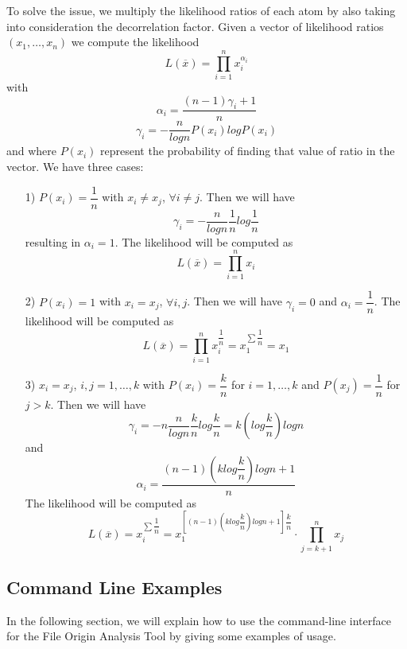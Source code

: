 To solve the issue, we multiply the likelihood ratios of each atom by also taking into consideration the decorrelation factor.
Given a vector of likelihood ratios $(x_{1},\ldots,x_{n})$ we compute the likelihood $$ L(\overline{x}) = \prod\limits_{i=1}^{n} x_{i}^{\alpha_{i}} $$ with $$ \alpha_{i} = \dfrac{(n-1)\gamma_{i}+1}{n} $$ $$ \gamma_{i} = - \dfrac{n}{log n} P(x_{i})log P(x_{i}) $$ and where $P(x_{i})$ represent the probability of finding that value of ratio in the vector.
We have three cases:

\begin{itemize}

\item[1)] $P(x_{i}) = \dfrac{1}{n} $ with $x_{i} \neq x_{j}$, $ \forall i \neq j $.
Then we will have $$ \gamma_{i} = - \dfrac{n}{log n} \dfrac{1}{n} log\dfrac{1}{n} $$ resulting in $\alpha_{i} = 1$.
The likelihood will be computed as $$L(\overline{x}) = \prod\limits_{i=1}^{n} x_{i} $$

\item[2)] $P(x_{i}) = 1 $ with $x_{i} = x_{j}$, $ \forall i,j $.
Then we will have $ \gamma_{i} = 0 $ and $\alpha_{i} = \dfrac{1}{n} $.
The likelihood will be computed as $$L(\overline{x}) = \prod\limits_{i=1}^{n} x_{i}^{\dfrac{1}{n}} = x_{1}^{\sum \dfrac{1}{n}} = x_{1} $$

\item[3)]  $x_{i} = x_{j}$, $ i,j = 1,\ldots,k $ with $P(x_{i}) = \dfrac{k}{n} $ for $i = 1,\ldots,k$ and $P(x_{j}) = \dfrac{1}{n}$ for $j > k$.
Then we will have $$ \gamma_{i} = -n \dfrac{n}{log n} \dfrac{k}{n} log \dfrac{k}{n} = k (log \dfrac{k}{n})log n $$ and 
$$ \alpha_{i} = \dfrac{(n-1)(k log \dfrac{k}{n})log n + 1}{n} $$
The likelihood will be computed as $$L(\overline{x}) = x_{i}^{\sum \dfrac{1}{n}} = x_{1}^{\left[ (n-1)(k log \dfrac{k}{n})log n + 1 \right] \dfrac{k}{n}} \cdot \prod\limits_{j=k+1}^{n} x_{j}  $$

\end{itemize}

\subsection{Command Line Examples}


In the following section, we will explain how to use the command-line interface for the File Origin Analysis Tool by giving some examples of usage.

